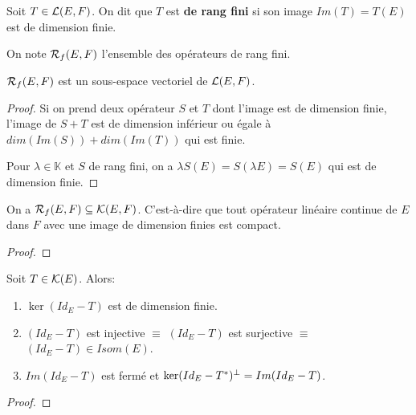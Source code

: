 \begin{definition}
	Soit $T \in \mathcal{L}(E, F)$. On dit que $T$ est \textbf{de rang fini}
	si son image $Im(T) = T(E)$ est de dimension finie.

	On note $\mathcal{R}_{f}(E, F)$ l'ensemble des opérateurs de rang fini.
\end{definition}

\begin{proposition}
	$\mathcal{R}_{f}(E, F)$ est un sous-espace vectoriel de
	$\mathcal{L}(E, F)$.
\end{proposition}

\begin{proof}
	Si on prend deux opérateur $S$ et $T$ dont l'image est de dimension finie,
	l'image de $S + T$ est de dimension inférieur ou égale à $dim(Im(S)) +
	dim(Im(T))$ qui est finie.

	Pour $\lambda \in \mathbb{K}$ et $S$ de rang fini, on a $\lambda S(E) =
	S(\lambda E) = S(E)$ qui est de dimension finie.
\end{proof}

\begin{proposition}
	On a $\mathcal{R}_{f}(E, F) \subseteq \mathcal{K}(E, F)$. C'est-à-dire
	que tout opérateur linéaire continue de $E$ dans $F$ avec une image de
	dimension finies est compact.
\end{proposition}

\begin{proof}
	
\end{proof}


\begin{proposition}
	Soit $T \in \mathcal{K}(E)$. Alors:

\begin{enumerate}
	\item $\ker(Id_{E} - T)$ est de dimension finie.
	\item $(Id_{E} - T)$ est injective $\equiv$ $(Id_{E} - T)$ est surjective
		$\equiv$ $(Id_{E} - T) \in Isom(E)$.
	\item $Im(Id_{E} - T)$ est fermé et $\ker(Id_{E} - T^{*})^{\perp} = Im(Id_{E}
		- T)$.
\end{enumerate}
\end{proposition}

\begin{proof}
	
\end{proof}

